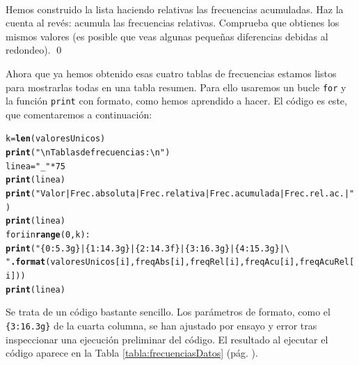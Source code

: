 \documentclass[10pt,a4paper]{article}\usepackage[]{graphicx}\usepackage[]{color}
\makeatletter
\newcommand{\hlstr}[1]{\textcolor[rgb]{0.192,0.494,0.8}{#1}}%
\newcommand{\hlkwd}[1]{\textcolor[rgb]{0.737,0.353,0.396}{\textbf{#1}}}%
\newenvironment{kframe}{%
 \def\at@end@of@kframe{}%
 \ifinner\ifhmode%
  \def\at@end@of@kframe{\end{minipage}}%
  \begin{minipage}{\columnwidth}%
 \fi\fi%
 \def\FrameCommand##1{\hskip\@totalleftmargin \hskip-\fboxsep
 \colorbox{shadecolor}{##1}\hskip-\fboxsep
     \hskip-\linewidth \hskip-\@totalleftmargin \hskip\columnwidth}%
 \MakeFramed {\advance\hsize-\width
   \@totalleftmargin\z@ \linewidth\hsize
   \@setminipage}}%
 {\par\unskip\endMakeFramed%
 \at@end@of@kframe}
\newenvironment{knitrout}{}{} %
\newcounter {cont01}
\makeatother
\begin{document}
\begin{ejercicio}
\label{tut02:ejercicio24}
\quad\\
Hemos construido la lista haciendo relativas las frecuencias acumuladas. Haz la cuenta al revés: acumula las frecuencias relativas. Comprueba que obtienes los mismos valores (es posible que veas algunas pequeñas diferencias debidas al redondeo).
\qed
\end{ejercicio}

Ahora que ya hemos obtenido esas cuatro tablas de frecuencias estamos listos para mostrarlas todas en una tabla resumen. Para ello usaremos un bucle {\tt for} y la función {\tt print} con formato, como hemos aprendido a hacer. El código es este, que comentaremos a continuación:
\begin{knitrout}
\color{fgcolor}\begin{kframe}
\begin{alltt}
k = \hlkwd{len}(valoresUnicos)
\hlkwd{print}(\hlstr{"\textbackslash{}nTablas de frecuencias:\textbackslash{}n"}) 
linea = \hlstr{"_"} * 75
\hlkwd{print}(linea)
\hlkwd{print}(\hlstr{"Valor | Frec. absoluta | Frec. relativa | Frec. acumulada | Frec. rel. ac. |"})
\hlkwd{print}(linea)
for i in \hlkwd{range}(0,k):
    \hlkwd{print}("\{0:5.3g\} | \{1:14.3g\} | \{2:14.3f\} |\{3:16.3g\} |\{4:15.3g\} |\textbackslash{}
    "\hlkwd{.format}(valoresUnicos[i], freqAbs[i], freqRel[i], freqAcu[i], freqAcuRel[i]))
\hlkwd{print}(linea)    
\end{alltt}
\end{kframe}
\end{knitrout}
Se trata de un código bastante sencillo. Los parámetros de formato, como el \verb&{3:16.3g}& de la cuarta columna, se han ajustado por ensayo y error tras inspeccionar una ejecución preliminar del código. El resultado al ejecutar el código aparece en la Tabla \ref{tabla:frecuenciasDatos} (pág. \pageref{tabla:frecuenciasDatos}).
\end{document}
